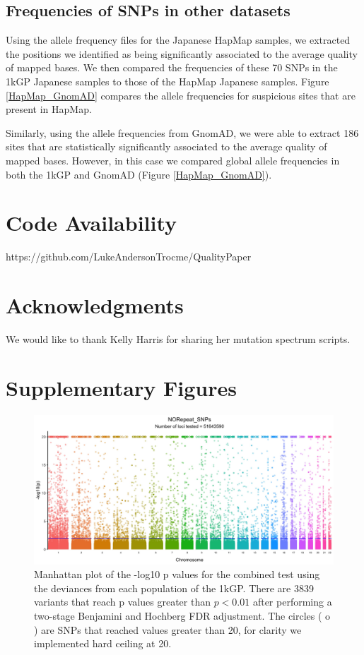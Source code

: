 \documentclass[9pt,lineno]{elife}
\begin{document}
\subsection{Frequencies of SNPs in other datasets}
Using the allele frequency files for the Japanese HapMap samples, we extracted the positions we identified as being significantly associated to the average quality of mapped bases. We then compared the frequencies of these 70 SNPs in the 1kGP Japanese samples to those of the HapMap Japanese samples. Figure \ref{HapMap_GnomAD} compares the allele frequencies for suspicious sites that are present in HapMap.

Similarly, using the allele frequencies from GnomAD, we were able to extract 186 sites that are statistically significantly associated to the average quality of mapped bases. However, in this case we compared global allele frequencies in both the 1kGP and GnomAD (Figure \ref{HapMap_GnomAD}). 

\section{Code Availability}
https://github.com/LukeAndersonTrocme/QualityPaper

\section{Acknowledgments}
We would like to thank Kelly Harris for sharing her mutation spectrum scripts.



\clearpage
\section{Supplementary Figures}

\renewcommand{\thefigure}{S\arabic{figure}}
\setcounter{figure}{0}   	

\begin{figure}[h]
\includegraphics[width=\hsize,keepaspectratio]{./Figures/ManhattanPlot_NORepeat_SNPs.jpg}

\caption{Manhattan plot of the -log10 p values for the combined test using the deviances from each population of the 1kGP. 
There are 3839 variants that reach p values greater than $ p < 0.01$ after performing a two-stage Benjamini and Hochberg FDR adjustment. 
The circles ( o ) are SNPs that reached values greater than 20, for clarity we implemented hard ceiling at 20.}
 \label{NRS_Manhattan}
\end{figure}
\end{document}
